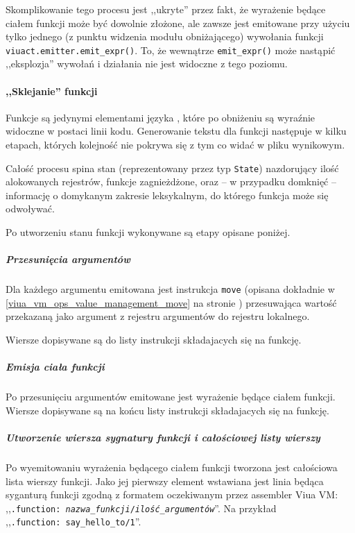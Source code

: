 Skomplikowanie tego procesu jest ,,ukryte'' przez fakt, że wyrażenie będące
ciałem funkcji może być dowolnie złożone, ale zawsze jest emitowane przy użyciu
tylko jednego (z punktu widzenia modułu obniżającego) wywołania funkcji
\texttt{viuact.emitter.emit\_expr()}. To, że wewnątrze \texttt{emit\_expr()}
może nastąpić ,,eksplozja'' wywołań i działania nie jest widoczne z tego
poziomu.

\paragraph{,,Sklejanie'' funkcji}

Funkcje są jedynymi elementami języka \ViuAct\phantom{}, które po obniżeniu są
wyraźnie widoczne w postaci linii kodu. Generowanie tekstu dla funkcji następuje
w kilku etapach, których kolejność nie pokrywa się z tym co widać w pliku
wynikowym.

Całość procesu spina stan (reprezentowany przez typ \texttt{State}) nazdorujący
ilość alokowanych rejestrów, funkcje zagnieżdżone, oraz -- w przypadku domknięć
-- informację o domykanym zakresie leksykalnym, do którego funkcja może się
odwoływać.

Po utworzeniu stanu funkcji wykonywane są etapy opisane poniżej.

\subparagraph{Przesunięcia argumentów}

Dla każdego argumentu emitowana jest instrukcja \texttt{move} (opisana dokładnie
w \ref{viua_vm_ops_value_management_move} na stronie \pageref{viua_vm_ops_value_management_move})
przesuwająca wartość przekazaną jako argument z rejestru argumentów do
rejestru lokalnego.

Wiersze dopisywane są do listy instrukcji składajacych się na funkcję.

\subparagraph{Emisja ciała funkcji}

Po przesunięciu argumentów emitowane jest wyrażenie będące ciałem funkcji.
Wiersze dopisywane są na końcu listy instrukcji składajacych się na funkcję.

\subparagraph{Utworzenie wiersza sygnatury funkcji i całościowej listy wierszy}

Po wyemitowaniu wyrażenia będącego ciałem funkcji tworzona jest całościowa lista
wierszy funkcji. Jako jej pierwszy element wstawiana jest linia będąca syganturą
funkcji zgodną z formatem oczekiwanym przez assembler Viua VM:
,,\texttt{.function: \emph{nazwa\_funkcji}/\emph{ilość\_argumentów}}''.
Na przykład ,,\texttt{.function:~say\_hello\_to/1}''.

